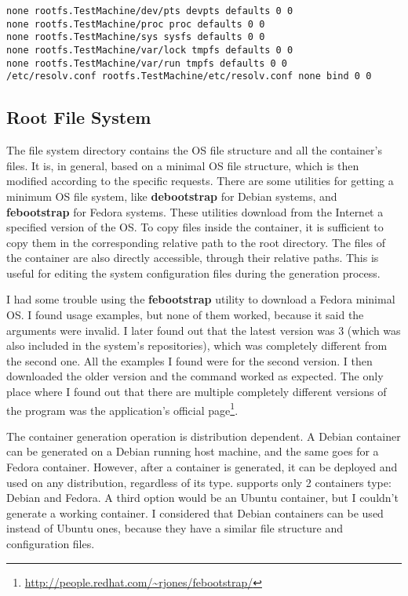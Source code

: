 \lstset{caption=Sample fstab file,label=lst:lxc-fstab}
\begin{lstlisting}
none rootfs.TestMachine/dev/pts devpts defaults 0 0
none rootfs.TestMachine/proc proc defaults 0 0
none rootfs.TestMachine/sys sysfs defaults 0 0
none rootfs.TestMachine/var/lock tmpfs defaults 0 0
none rootfs.TestMachine/var/run tmpfs defaults 0 0
/etc/resolv.conf rootfs.TestMachine/etc/resolv.conf none bind 0 0
\end{lstlisting}

\subsection{Root File System}
\label{sub-sec:lxc-rootfs}
The file system directory contains the OS file structure and all the container's
files. It is, in general, based on a minimal OS file structure, which is then
modified according to the specific requests. There are some utilities for
getting a minimum OS file system, like \textbf{debootstrap} for Debian systems,
and \textbf{febootstrap} for Fedora systems. These utilities download from the
Internet a specified version of the OS. To copy files inside the container, it
is sufficient to copy them in the corresponding relative path to the root
directory. The files of the container are also directly accessible, through
their relative paths. This is useful for editing the system configuration files
during the generation process.

I had some trouble using the \textbf{febootstrap} utility to download a Fedora
minimal OS. I found usage examples, but none of them worked, because it said
the arguments were invalid. I later found out that the latest version was 3
(which was also included in the system's repositories), which was completely
different from the second one. All the examples I found were for the second
version. I then downloaded the older version and the command worked as
expected. The only place where I found out that there are multiple completely
different versions of the program was the application's official
page\footnote{\url{http://people.redhat.com/~rjones/febootstrap/}}.

The container generation operation is distribution dependent. A Debian
container can be generated on a Debian running host machine, and the same goes
for a Fedora container. However, after a container is generated, it can be
deployed and used on any distribution, regardless of its type. \project
supports only 2 containers type: Debian and Fedora. A third option would be an
Ubuntu container, but I couldn't generate a working container. I considered
that Debian containers can be used instead of Ubuntu ones, because they have a
similar file structure and configuration files.

